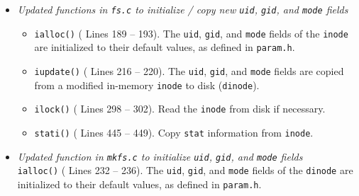 \documentclass[11pt,letterpaper]{report}
\begin{document}
\begin{itemize}
		\item \emph{Updated functions in {\tt fs.c} to initialize / copy new {\tt uid}, {\tt gid}, and {\tt mode} fields}
		\begin{itemize}
			\item {\tt ialloc()} ({\color{red} Lines 189 -- 193}). The {\tt uid}, {\tt gid}, and {\tt mode} fields of the {\tt inode} are initialized to their default values, as defined in {\tt param.h}.
			
			\item {\tt iupdate()} ({\color{red} Lines 216 -- 220}). The {\tt uid}, {\tt gid}, and {\tt mode} fields are copied from a modified in-memory {\tt inode} to disk ({\tt dinode}).
			
			\item {\tt ilock()} ({\color{red} Lines 298 -- 302}). Read the {\tt inode} from disk if necessary.
			
			\item {\tt stati()} ({\color{red} Lines 445 -- 449}). Copy {\tt stat} information from {\tt inode}.
			
		\end{itemize}
		
		\item \emph{Updated function in {\tt mkfs.c} to initialize {\tt uid}, {\tt gid}, and {\tt mode} fields}\\
		{\tt ialloc()} ({\color{red} Lines 232 -- 236}). The {\tt uid}, {\tt gid}, and {\tt mode} fields of the {\tt dinode} are initialized to their default values, as defined in {\tt param.h}.
		
	\end{itemize}

\end{document}
